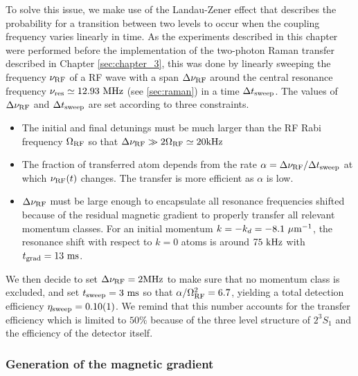To solve this issue, we make use of the Landau-Zener effect that describes the probability for a transition between two levels to occur when the coupling frequency varies linearly in time. As the experiments described in this chapter were performed before the implementation of the two-photon Raman transfer described in Chapter \ref{sec:chapter_3}, this was done by linearly sweeping the frequency $\nu_{\rm{RF}}$ of a RF wave with a span $\Delta \nu_{\rm{RF}}$ around the central resonance frequency $\nu_{\rm{res}} \simeq 12.93 \ \rm{MHz}$ (see \ref{sec:raman}) in a time $\Delta t_{\rm{sweep}}$. The values of $\Delta \nu_{\rm{RF}}$ and $\Delta t_{\rm{sweep}}$ are set according to three constraints.

\begin{itemize}
    \item The initial and final detunings must be much larger than the RF Rabi frequency $\Omega_{\rm{RF}}$ so that $\Delta \nu_{\rm{RF}} \gg 2 \Omega_{\rm{RF}} \simeq 20 \rm{kHz}$
    \item The fraction of transferred atom depends from the rate $\alpha = \Delta \nu_{\rm{RF}}/ \Delta t_{\rm{sweep}}$ at which $\nu_{\rm{RF}}(t)$ changes. The transfer is more efficient as $\alpha$ is low. 
    \item $\Delta \nu_{\rm{RF}}$ must be large enough to encapsulate all resonance frequencies shifted because of the residual magnetic gradient to properly transfer all relevant momentum classes. For an initial momentum $k=-k_d=-8.1 \ \mu \rm{m}^{-1}$, the resonance shift with respect to $k=0$ atoms is around $75 \ \rm{kHz}$ with $t_{\rm{grad}}=13 \ \rm{ms}$.
\end{itemize}

We then decide to set $\Delta \nu_{\rm{RF}}=2 \rm{MHz}$ to make sure that no momentum class is excluded, and set $t_{\rm{sweep}}=3 \ \rm{ms}$ so that $\alpha/\Omega^2_{\rm{RF}}=6.7$, yielding a total detection efficiency $\eta_{\rm{sweep}}=0.10(1)$. We remind that this number accounts for the transfer efficiency which is limited to $50 \%$ because of the three level structure of $2 ^3 S_1$ and the efficiency of the detector itself.

\subsubsection{Generation of the magnetic gradient}

